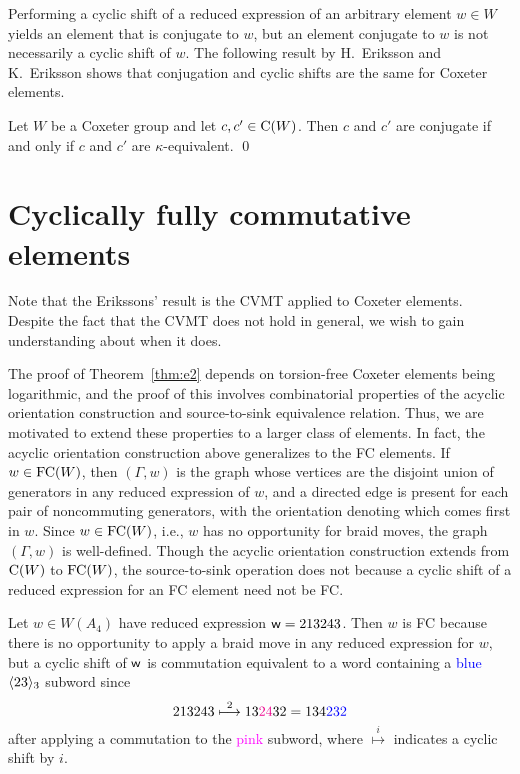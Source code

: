     Performing a cyclic shift of a reduced expression of an arbitrary element $w \in W$ yields an element that is conjugate to $w$, but an element conjugate to $w$ is not necessarily a cyclic shift of $w$.
    The following result by H.~Eriksson and K.~Eriksson shows that conjugation and cyclic shifts are the same for Coxeter elements.

\begin{theorem} \label{thm:e2} Let $W$ be a Coxeter group and let $c, c' \in \C(W)$. Then $c$ and $c'$ are conjugate if and only if $c$ and $c'$ are $\kappa$-equivalent. \qed
\end{theorem}

\section{Cyclically fully commutative elements}\label{sec:CFC}
    Note that the Erikssons' result is the CVMT applied to Coxeter elements. Despite the fact that the CVMT does not hold in general, we wish to gain understanding about when it does.

    The proof of Theorem~\ref{thm:e2} depends on torsion-free Coxeter elements being logarithmic, and the proof of this involves combinatorial properties of the acyclic orientation construction and source-to-sink equivalence relation.
    Thus, we are motivated to extend these properties to a larger class of elements. In fact, the acyclic orientation construction above generalizes to the FC elements.
    If $w \in \FC(W)$, then $(\Gamma,w)$ is the graph whose vertices are the disjoint union of generators in any reduced expression of $w$, and a directed edge is present for each pair of noncommuting generators, with the orientation denoting which comes first in $w$.
    Since $w \in \FC(W)$, i.e., $w$ has no opportunity for braid moves, the graph $(\Gamma,w)$ is well-defined. Though the acyclic orientation construction extends from $\C(W)$ to $\FC(W)$, the source-to-sink operation does not because a cyclic shift of a reduced expression for an FC element need not be FC.
    
\begin{example} Let $w \in W(A_4)$ have reduced expression $\w = 213243$. Then $w$ is FC because there is no opportunity to apply a braid move in any reduced expression for $w$, but a cyclic shift of $\w$ is commutation equivalent to a word containing a \textcolor{blue}{blue} $\gen{23}_3$ subword since
    $$213243 \overset{2}{\mapsto} 13\textcolor{magenta}{24}32 = 134\textcolor{blue}{232}$$ after applying a commutation to the \textcolor{magenta}{pink} subword, where $\overset{i}{\longmapsto}$ indicates a cyclic shift by $i$.
\end{example}


